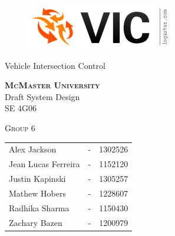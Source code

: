 \documentclass [10pt]{article}
\begin{document}
\begin {center} 

\thispagestyle{empty}
\vspace*{5cm}

\begin {figure}[h!]
\centering
\hspace{-10mm}\includegraphics [scale = .5, trim={.4cm 0 .8cm 0},clip] {figures/vic_logo.png}
\end {figure}

{\fontfamily{\cabinfamily}\selectfont
\Huge{Vehicle Intersection Control} }

\vspace{1 cm}
{\Large\textbf{\textsc{McMaster University}}\\}  \vspace {1cm}
{\Large Draft System Design\\ \vspace {0.4 cm} SE 4G06}  \vspace {1cm}

{\large \textsc{Group 6} \\} \vspace{1cm}

\begin{tabular}{ l c  l}
Alex Jackson &-& 1302526\\
Jean Lucas Ferreira &-& 1152120 \\
Justin Kapinski &-& 1305257\\
Mathew Hobers &-& 1228607\\
Radhika Sharma &-& 1150430\\
Zachary Bazen &-& 1200979
\end{tabular}




\end{center}


\pagebreak


\tableofcontents
\listoftables
\listoffigures



\pagebreak


\thispagestyle{empty}
\end{document}
